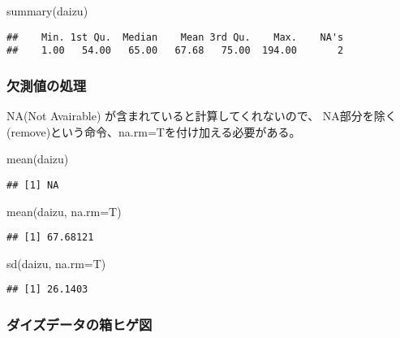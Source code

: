 \documentclass[
]{article}
\newenvironment{Shaded}{\begin{snugshade}}{\end{snugshade}}
\newcommand{\AttributeTok}[1]{\textcolor[rgb]{0.77,0.63,0.00}{#1}}
\newcommand{\FunctionTok}[1]{\textcolor[rgb]{0.00,0.00,0.00}{#1}}
\newcommand{\NormalTok}[1]{#1}
\begin{document}
\begin{Shaded}
\begin{Highlighting}[]
    \FunctionTok{summary}\NormalTok{(daizu)}
\end{Highlighting}
\end{Shaded}

\begin{verbatim}
##    Min. 1st Qu.  Median    Mean 3rd Qu.    Max.    NA's 
##    1.00   54.00   65.00   67.68   75.00  194.00       2
\end{verbatim}

\hypertarget{ux6b20ux6e2cux5024ux306eux51e6ux7406}{%
\subsubsection{欠測値の処理}\label{ux6b20ux6e2cux5024ux306eux51e6ux7406}}

NA(Not Avairable) が含まれていると計算してくれないので、
NA部分を除く(remove)という命令、na.rm=Tを付け加える必要がある。

\begin{Shaded}
\begin{Highlighting}[]
    \FunctionTok{mean}\NormalTok{(daizu)}
\end{Highlighting}
\end{Shaded}

\begin{verbatim}
## [1] NA
\end{verbatim}

\begin{Shaded}
\begin{Highlighting}[]
    \FunctionTok{mean}\NormalTok{(daizu, }\AttributeTok{na.rm=}\NormalTok{T)}
\end{Highlighting}
\end{Shaded}

\begin{verbatim}
## [1] 67.68121
\end{verbatim}

\begin{Shaded}
\begin{Highlighting}[]
    \FunctionTok{sd}\NormalTok{(daizu, }\AttributeTok{na.rm=}\NormalTok{T)}
\end{Highlighting}
\end{Shaded}

\begin{verbatim}
## [1] 26.1403
\end{verbatim}

\hypertarget{ux30c0ux30a4ux30baux30c7ux30fcux30bfux306eux7bb1ux30d2ux30b2ux56f3}{%
\subsubsection{ダイズデータの箱ヒゲ図}\label{ux30c0ux30a4ux30baux30c7ux30fcux30bfux306eux7bb1ux30d2ux30b2ux56f3}}
\end{document}
